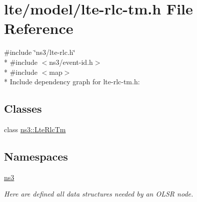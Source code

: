 \hypertarget{lte-rlc-tm_8h}{}\section{lte/model/lte-\/rlc-\/tm.h File Reference}
\label{lte-rlc-tm_8h}
{\ttfamily \#include \char`\"{}ns3/lte-\/rlc.\+h\char`\"{}}\\*
{\ttfamily \#include $<$ns3/event-\/id.\+h$>$}\\*
{\ttfamily \#include $<$map$>$}\\*
Include dependency graph for lte-\/rlc-\/tm.h\+:
\subsection*{Classes}
\begin{DoxyCompactItemize}
\item 
class \hyperlink{classns3_1_1LteRlcTm}{ns3\+::\+Lte\+Rlc\+Tm}
\end{DoxyCompactItemize}
\subsection*{Namespaces}
\begin{DoxyCompactItemize}
\item 
 \hyperlink{namespacens3}{ns3}
\begin{DoxyCompactList}\small\item\em Here are defined all data structures needed by an O\+L\+SR node. \end{DoxyCompactList}\end{DoxyCompactItemize}
